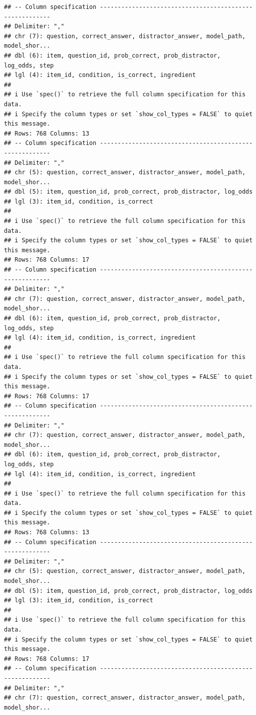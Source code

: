 \documentclass[
]{article}
\begin{document}
\begin{verbatim}
## -- Column specification --------------------------------------------------------
## Delimiter: ","
## chr (7): question, correct_answer, distractor_answer, model_path, model_shor...
## dbl (6): item, question_id, prob_correct, prob_distractor, log_odds, step
## lgl (4): item_id, condition, is_correct, ingredient
## 
## i Use `spec()` to retrieve the full column specification for this data.
## i Specify the column types or set `show_col_types = FALSE` to quiet this message.
## Rows: 768 Columns: 13
## -- Column specification --------------------------------------------------------
## Delimiter: ","
## chr (5): question, correct_answer, distractor_answer, model_path, model_shor...
## dbl (5): item, question_id, prob_correct, prob_distractor, log_odds
## lgl (3): item_id, condition, is_correct
## 
## i Use `spec()` to retrieve the full column specification for this data.
## i Specify the column types or set `show_col_types = FALSE` to quiet this message.
## Rows: 768 Columns: 17
## -- Column specification --------------------------------------------------------
## Delimiter: ","
## chr (7): question, correct_answer, distractor_answer, model_path, model_shor...
## dbl (6): item, question_id, prob_correct, prob_distractor, log_odds, step
## lgl (4): item_id, condition, is_correct, ingredient
## 
## i Use `spec()` to retrieve the full column specification for this data.
## i Specify the column types or set `show_col_types = FALSE` to quiet this message.
## Rows: 768 Columns: 17
## -- Column specification --------------------------------------------------------
## Delimiter: ","
## chr (7): question, correct_answer, distractor_answer, model_path, model_shor...
## dbl (6): item, question_id, prob_correct, prob_distractor, log_odds, step
## lgl (4): item_id, condition, is_correct, ingredient
## 
## i Use `spec()` to retrieve the full column specification for this data.
## i Specify the column types or set `show_col_types = FALSE` to quiet this message.
## Rows: 768 Columns: 13
## -- Column specification --------------------------------------------------------
## Delimiter: ","
## chr (5): question, correct_answer, distractor_answer, model_path, model_shor...
## dbl (5): item, question_id, prob_correct, prob_distractor, log_odds
## lgl (3): item_id, condition, is_correct
## 
## i Use `spec()` to retrieve the full column specification for this data.
## i Specify the column types or set `show_col_types = FALSE` to quiet this message.
## Rows: 768 Columns: 17
## -- Column specification --------------------------------------------------------
## Delimiter: ","
## chr (7): question, correct_answer, distractor_answer, model_path, model_shor...

\end{verbatim}
\end{document}
